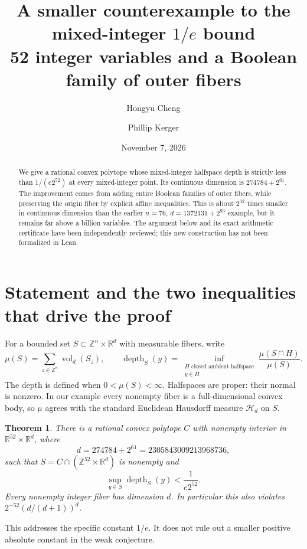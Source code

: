 \documentclass[11pt]{article}
\title{A smaller counterexample to the mixed-integer \texorpdfstring{\(1/e\)}{1/e} bound\\[3pt]
\large 52 integer variables and a Boolean family of outer fibers}
\author{Hongyu Cheng \and Phillip Kerger}
\date{November 7, 2026}
\newtheorem{theorem}{Theorem}
\newcommand{\R}{\mathbb R}
\newcommand{\Z}{\mathbb Z}
\newcommand{\vol}{\operatorname{vol}}
\newcommand{\MI}{\mu}
\newcommand{\depth}{\operatorname{depth}}
\begin{document}
\maketitle
\begin{abstract}
We give a rational convex polytope whose mixed-integer halfspace depth is
strictly less than $1/(e2^{52})$ at every mixed-integer point. Its continuous
dimension is $274784+2^{61}$. The improvement comes from adding entire
Boolean families of outer fibers, while preserving the origin fiber by
explicit affine inequalities. This is about $2^{32}$ times smaller in
continuous dimension than the earlier $n=76$, $d=1372131+2^{93}$ example,
but it remains far above a billion variables. The argument below and its
exact arithmetic certificate have been independently reviewed; this new
construction has not been formalized in Lean.
\end{abstract}

\section{Statement and the two inequalities that drive the proof}
For a bounded set $S\subset\Z^n\times\R^d$ with measurable fibers, write
\[
 \MI(S)=\sum_{z\in\Z^n}\vol_d(S_z),\qquad
 \depth_S(y)=\inf_{\substack{H\text{ closed ambient halfspace}\\y\in H}}
                 \frac{\MI(S\cap H)}{\MI(S)}.
\]
The depth is defined when $0<\MI(S)<\infty$.
Halfspaces are proper: their normal is nonzero. In our example every
nonempty fiber is a full-dimensional convex body, so $\MI$ agrees with
the standard Euclidean Hausdorff measure $\mathcal H_d$ on $S$.

\begin{theorem}\label{thm:main}
There is a rational convex polytope $C$ with nonempty interior in
$\R^{52}\times\R^d$, where
\[
 d=274784+2^{61}=2305843009213968736,
\]
such that $S=C\cap(\Z^{52}\times\R^d)$ is nonempty and
\[
 \sup_{y\in S}\depth_S(y)<\frac1{e2^{52}}.
\]
Every nonempty integer fiber has dimension $d$. In particular this
also violates $2^{-52}(d/(d+1))^d$.
\end{theorem}

This addresses the specific constant $1/e$. It does not rule out a smaller
positive absolute constant in the weak conjecture.
\end{document}
